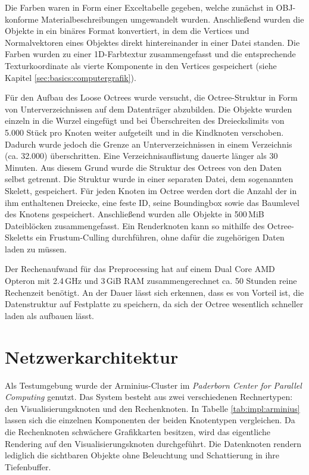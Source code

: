 Die Farben waren in Form einer Exceltabelle gegeben, welche zunächst in OBJ-konforme Materialbeschreibungen umgewandelt wurden. Anschließend wurden die Objekte in ein binäres Format konvertiert, in dem die Vertices und Normalvektoren eines Objektes direkt hintereinander in einer Datei standen. Die Farben wurden zu einer 1D-Farbtextur zusammengefasst und die entsprechende Texturkoordinate als vierte Komponente in den Vertices gespeichert (siehe Kapitel \ref{sec:basics:computergrafik}). 

Für den Aufbau des Loose Octrees wurde versucht, die Octree-Struktur in Form von Unterverzeichnissen auf dem Datenträger abzubilden. Die Objekte wurden einzeln in die Wurzel eingefügt und bei Überschreiten des Dreieckslimits von 5.000 Stück pro Knoten weiter aufgeteilt und in die Kindknoten verschoben. Dadurch wurde jedoch die Grenze an Unterverzeichnissen in einem Verzeichnis (ca. 32.000) überschritten. Eine Verzeichnisauflistung dauerte länger als 30 Minuten. Aus diesem Grund wurde die Struktur des Octrees von den Daten selbst getrennt. Die Struktur wurde in einer separaten Datei, dem sogenannten Skelett, gespeichert. Für jeden Knoten im Octree werden dort die Anzahl der in ihm enthaltenen Dreiecke, eine feste ID, seine Bound\-ing\-box sowie das Baumlevel des Knotens gespeichert. Anschließend wurden alle Objekte in 500\,MiB Dateiblöcken zusammengefasst. Ein Renderknoten kann so mithilfe des Octree-Skeletts ein Frustum-Culling durchführen, ohne dafür die zugehörigen Daten laden zu müssen.

Der Rechenaufwand für das Preprocessing hat auf einem Dual Core AMD Opteron mit 2.4\,GHz und 3\,GiB RAM zusammengerechnet ca. 50 Stunden reine Rechenzeit benötigt. An der Dauer lässt sich erkennen, dass es von Vorteil ist, die Datenstruktur auf Festplatte zu speichern, da sich der Octree wesentlich schneller laden als aufbauen lässt.

\section{Netzwerkarchitektur}
\label{sec:impl:netzwerkarchitektur}
Als Testumgebung wurde der Arminius-Cluster im \emph{Paderborn Center for Parallel Computing} genutzt. Das System besteht aus zwei verschiedenen Rechnertypen: den Visualisierungsknoten und den Rechenknoten. In Tabelle \ref{tab:impl:arminius} lassen sich die einzelnen Komponenten der beiden Knotentypen vergleichen. Da die Rechenknoten schwächere Grafikkarten besitzen, wird das eigentliche Rendering auf den Visualisierungsknoten durchgeführt. Die Datenknoten rendern lediglich die sichtbaren Objekte ohne Beleuchtung und Schattierung in ihre Tiefenbuffer.


